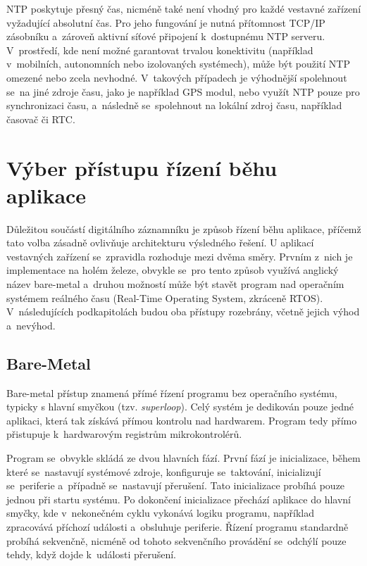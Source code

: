 NTP poskytuje přesný čas, nicméně také není vhodný pro každé vestavné zařízení vyžadující absolutní čas. Pro jeho fungování je nutná přítomnost TCP/IP zásobníku a~zároveň aktivní síťové připojení k~dostupnému NTP serveru. V~prostředí, kde není možné garantovat trvalou konektivitu (například v~mobilních, autonomních nebo izolovaných systémech), může být použití NTP omezené nebo zcela nevhodné. V~takových případech je výhodnější spolehnout se~na jiné zdroje času, jako je například GPS modul, nebo využít NTP pouze pro synchronizaci času, a~následně se~spolehnout na lokální zdroj času, například časovač či RTC.

\section{Výber přístupu řízení běhu aplikace}
Důležitou součástí digitálního záznamníku je způsob řízení běhu aplikace, příčemž tato volba zásadně ovlivňuje architekturu výsledného řešení. U aplikací vestavných zařízení se~zpravidla rozhoduje mezi dvěma směry. Prvním z~nich je implementace na holém železe, obvykle se~pro tento způsob využívá anglický název bare-metal a~druhou možností může být stavět program nad operačním systémem reálného času (Real-Time Operating System, zkráceně RTOS). V~následujících podkapitolách budou oba přístupy rozebrány, včetně jejich výhod a~nevýhod. 

\subsection{Bare-Metal}
Bare-metal přístup znamená přímé řízení programu bez operačního systému, typicky s hlavní smyčkou (tzv. \emph{superloop}). Celý systém je dedikován pouze jedné aplikaci, která tak získává přímou kontrolu nad hardwarem. Program tedy přímo přistupuje k~hardwarovým registrům mikrokontrolérů.~\cite{sysgo_baremetal_vs_rtos}

Program se~obvykle skládá ze dvou hlavních fází. První fází je inicializace, během které se~nastavují systémové zdroje, konfiguruje se~taktování, inicializují se~periferie a~případně se~nastavují přerušení. Tato inicializace probíhá pouze jednou při startu systému. Po dokončení inicializace přechází aplikace do hlavní smyčky, kde v~nekonečném cyklu vykonává logiku programu, například zpracovává příchozí události a~obsluhuje periferie. Řízení programu standardně probíhá sekvenčně, nicméně od tohoto sekvenčního provádění se~odchýlí pouze tehdy, když dojde k~události přerušení.~\cite{sysgo_baremetal_vs_rtos}

